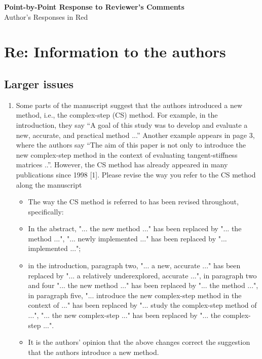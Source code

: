 \documentclass{article}
\begin{document}
\begin{center}
    {\LARGE \bf Point-by-Point Response to Reviewer's Comments} \\
     Author's Responses in {\color{red} Red}
\end{center}

\section{Re: Information to the authors}
%
\subsection*{Larger issues}
%
\begin{enumerate}
    \item
         Some parts of the manuscript suggest that the authors introduced a new method,
         i.e., the complex-step (CS) method. For example, in the introduction, they say
         “A goal of this study was to develop and evaluate a new, accurate, and practical
         method ...” Another example appears in page 3, where the authors say “The aim
         of this paper is not only to introduce the new complex-step method in the context
         of evaluating tangent-stiffness matrices ..”. However, the CS method has already
         appeared in many publications since 1998 [1]. Please revise the way you refer to
         the CS method along the manuscript

{\color{red}
  \begin{itemize}
      \item
        The way the CS method is referred to has been revised throughout,
        specifically: 
    \item In the abstract, "... the new method ..." has been
        replaced by "... the method ...", "... newly implemented ..." has been
        replaced by "... implemented ..."; 
    \item in the introduction, paragraph two,
        "... a new, accurate ..." has been replaced by "... a relatively
        underexplored, accurate ...", in paragraph two and four "... the new
        method ..." has been replaced by "... the method ...", in paragraph
        five, "... introduce the new complex-step method in the context of ..."
        has been replaced by "... study the complex-step method of ...", "...
        the new complex-step ..." has been replaced by "... the complex-step
        ...".
    \item 
        It is the authors' opinion that the above changes correct the suggestion
        that the authors introduce a new method. 


\end{itemize}}
\end{enumerate}
\end{document}
